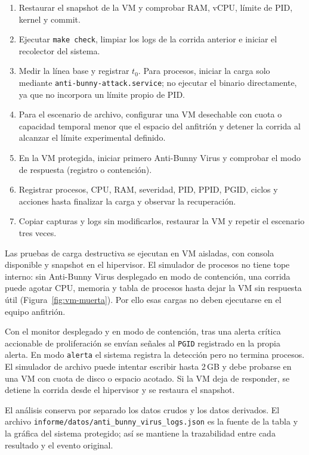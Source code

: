 \begin{enumerate}
  \item Restaurar el snapshot de la VM y comprobar RAM, vCPU, límite de PID,
        kernel y commit.
  \item Ejecutar \texttt{make check}, limpiar los logs de la corrida anterior
        e iniciar el recolector del sistema.
  \item Medir la línea base y registrar $t_0$. Para procesos, iniciar la carga
        solo mediante \texttt{anti-bunny-attack.service}; no ejecutar el binario
        directamente, ya que no incorpora un límite propio de PID.
  \item Para el escenario de archivo, configurar una VM desechable con cuota o
        capacidad temporal menor que el espacio del anfitrión y detener la
        corrida al alcanzar el límite experimental definido.
  \item En la VM protegida, iniciar primero Anti-Bunny Virus y comprobar el
        modo de respuesta (registro o contención).
  \item Registrar procesos, CPU, RAM, severidad, PID, PPID, PGID, ciclos y
        acciones hasta finalizar la carga y observar la recuperación.
  \item Copiar capturas y logs sin modificarlos, restaurar la VM y repetir el
        escenario tres veces.
\end{enumerate}

Las pruebas de carga destructiva se ejecutan en VM aisladas, con consola
disponible y snapshot en el hipervisor. El simulador de procesos no tiene tope
interno: sin Anti-Bunny Virus desplegado en modo de contención, una corrida puede
agotar CPU, memoria y tabla de procesos hasta dejar la VM sin respuesta útil
(Figura~\ref{fig:vm-muerta}). Por ello esas cargas no deben ejecutarse en el
equipo anfitrión.

Con el monitor desplegado y en modo de contención, tras una alerta crítica
accionable de proliferación se envían señales al \texttt{PGID} registrado en la
propia alerta. En modo \texttt{alerta} el sistema registra la detección pero no
termina procesos. El simulador de archivo puede intentar escribir hasta 2\,GB y
debe probarse en una VM con cuota de disco o espacio acotado. Si la VM deja de
responder, se detiene la corrida desde el hipervisor y se restaura el snapshot.

El análisis conserva por separado los datos crudos y los datos derivados. El
archivo \texttt{informe/datos/anti\_bunny\_virus\_logs.json} es la fuente de la
tabla y la gráfica del sistema protegido; así se mantiene la trazabilidad entre
cada resultado y el evento original.

